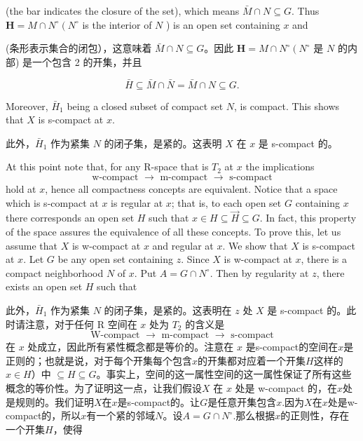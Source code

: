 \documentclass[options]{article}
\begin{document}
\begin{paracol}{2}
	\begin{en}
		(the bar indicates the closure of the set), which means $\bar{M} \cap N \subseteq G$. Thus $\boldsymbol{H}=M \cap N^{\circ}\left(N^{\circ}\right.$ is the interior of $N$ ) is an open set containing $x$ and

	\end{en}
		
	\begin{cn}
		(条形表示集合的闭包），这意味着 $\bar{M} \cap N \subseteq G$。因此 $\boldsymbol{H}=M \cap N^{\circ}\left(N^{\circ}\right.$ 是 $N$ 的内部) 是一个包含 2 的开集，并且
	\end{cn}
\end{paracol}
	\[
	\bar{H} \subseteq \bar{M} \cap \bar{N}=\bar{M} \cap N \subseteq G .
\]
\begin{paracol}{2}


	\begin{en}
		Moreover, $\bar{H}_1$ being a closed subset of compact set $N$, is compact. This shows
		that $X$ is s-compact at $x$.
	\end{en}
	\begin{cn}
		此外，$\bar{H}_1$ 作为紧集 $N$ 的闭子集，是紧的。这表明	$X$ 在 $x$ 是 s-compact 的。
	\end{cn}
	\begin{en}
		At this point note that, for any R-space
		that is $T_2$ at $x$ the implications
		\[
				\text { w-compact } \longrightarrow \text { m-compact } \longrightarrow \text { s-compact }
		\]
		hold at $x$, hence all compactness concepts are equivalent. Notice that a space which is	s-compact at $x$ is regular at $x$; that is, to each open set $G$ containing $x$ there
		corresponds an open set $H$ such that $x \in H\subseteq	\overrightarrow{H}\subseteq G$. In fact, this property of the space assures
		the equivalence of all these concepts. To prove this, let us assume that $X$ is w-compact
		at $x$ and regular at $x$. We show that $X$ is s-compact at $x$. Let $G$ be any open set
		containing $z$. Since $X$ is w-compact at $x$, there is a compact neighborhood $N$ of
		$x$. Put $A=G \cap N^{\circ}$. Then by regularity at $z$, there exists an open set
		$H$ such that

	\end{en}
	\begin{cn}
		此外，$\bar{H}_1$ 作为紧集 $N$ 的闭子集，是紧的。这表明在 $z$ 处 $X$ 是 s-compact 的。此时请注意，对于任何 R 空间在 $x$ 处为 $T_2$ 的含义是
		\[
				\text { W-compact } \longrightarrow \text { m-compact } \longrightarrow \text { s-compact }
		\]
		在 $x$ 处成立，因此所有紧性概念都是等价的。注意在 $x$ 是s-compact的空间在$x$是正则的；也就是说，对于每个开集每个包含$x$的开集都对应着一个开集$H$这样的$x \in H$）中 $\subseteq	H \subseteq G$。事实上，空间的这一属性空间的这一属性保证了所有这些概念的等价性。为了证明这一点，让我们假设$X$ 在 $x$ 处是 w-compact 的，在$x$处是规则的。我们证明$X$在$x$是s-compact的。让$G$是任意开集包含$x$.因为$X$在$x$处是w-compact的，所以$x$有一个紧的邻域$N$。设$A=G\cap N^{\circ}$.那么根据$x$的正则性，存在一个开集$H$，使得
	\end{cn}
\end{paracol}
\end{document}
